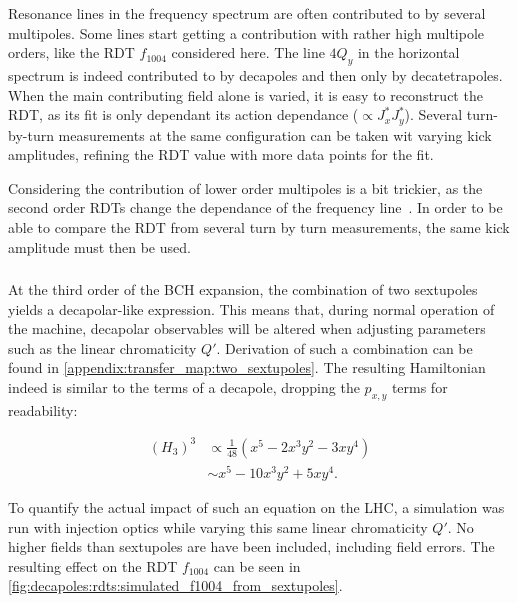 Resonance lines in the frequency spectrum are often contributed to by several multipoles. Some lines
start getting a contribution with rather high multipole orders, like the RDT $f_{1004}$ considered
here. The line $4Q_y$ in the horizontal spectrum is indeed contributed to by decapoles and then only
by decatetrapoles. When the main contributing field alone is varied, it is easy to reconstruct the
RDT, as its fit is only dependant its action dependance ($\propto J_x^{*} J_y^{*}$). Several
turn-by-turn measurements at the same configuration can be taken wit varying kick amplitudes,
refining the RDT value with more data points for the fit.

Considering the contribution of lower order multipoles is a bit trickier, as the second order RDTs
change the dependance of the frequency line~\cite{franchi_first_2014}. In order to be able to
compare the RDT from several turn by turn measurements, the same kick amplitude must then be used.



\subsubsection{}

At the third order of the BCH expansion, the combination of two sextupoles yields a decapolar-like
expression. This means that, during normal operation of the machine, decapolar observables will be
altered when adjusting parameters such as the linear chromaticity $Q'$. 
Derivation of such a combination can be found in \cref{appendix:transfer_map:two_sextupoles}. The
resulting Hamiltonian indeed is similar to the terms of a decapole, dropping the $p_{x,y}$ terms for
readability:

\begin{equation}
    \begin{aligned}
         (H_3)^3 &\propto \frac{1}{48} \left(x^5 - 2x^3y^2 - 3xy^4 \right)\\
                 &\sim    x^5 - 10x^3y^2 + 5xy^4.
    \end{aligned}
    \label{eq:decapoles:sextupoles_b5}
\end{equation}

To quantify the actual impact of such an equation on the LHC, a simulation was run with injection
optics while varying this same linear chromaticity $Q'$. No higher fields than sextupoles are 
have been included, including field errors. The resulting effect on the RDT $f_{1004}$
can be seen in \cref{fig:decapoles:rdts:simulated_f1004_from_sextupoles}.

